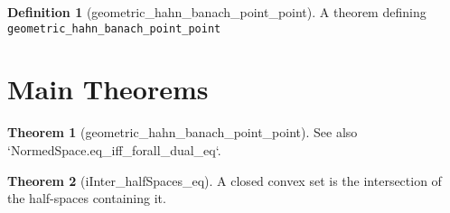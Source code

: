 \documentclass{article}
\theoremstyle{definition}
\newtheorem{definition}{Definition}
\newtheorem{theorem}{Theorem}
\begin{document}
\begin{definition}[geometric_hahn_banach_point_point]
A theorem defining \texttt{geometric_hahn_banach_point_point}
\end{definition}

\section{Main Theorems}
\begin{theorem}[geometric_hahn_banach_point_point]
See also `NormedSpace.eq_iff_forall_dual_eq`.
\end{theorem}

\begin{theorem}[iInter_halfSpaces_eq]
A closed convex set is the intersection of the half-spaces containing it.
\end{theorem}
\end{document}
